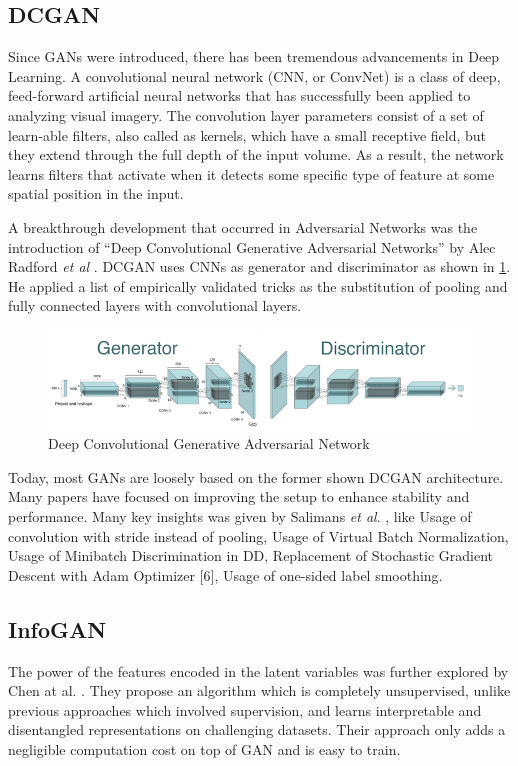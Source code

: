 \documentclass{vldb}
\begin{document}
\subsection{DCGAN}
Since GANs were introduced, there has been tremendous advancements in Deep Learning. A convolutional neural network (CNN, or ConvNet) \cite{imagenet} is a class of deep, feed-forward artificial neural networks that has successfully been applied to analyzing visual imagery. The convolution layer parameters consist of a set of learn-able filters, also called as kernels, which have a small receptive field, but they extend through the full depth of the input volume. As a result, the network learns filters that activate when it detects some specific type of feature at some spatial position in the input.
\par\bigskip
A breakthrough development that occurred in Adversarial Networks was the introduction of “Deep Convolutional Generative Adversarial Networks” by Alec Radford \textit{et al} \cite{dcgan}. DCGAN uses CNNs as generator and discriminator as shown in \ref{fig:dcgan}. He applied a list of empirically validated tricks as the substitution of pooling and fully connected layers with convolutional layers.
\par\bigskip
\begin{figure}[H]
\centering\includegraphics[width=\linewidth]{../Final_Report/images/dcgan.png}
\caption{Deep Convolutional Generative Adversarial Network}
\label{fig:dcgan}
\end{figure}
Today, most GANs are loosely based on the former shown DCGAN \cite{dcgan} architecture. Many papers have focused on improving the setup to enhance stability and performance. Many key insights was given by Salimans \textit{et al}. \cite{improvedgan}, like Usage of convolution with stride instead of pooling, Usage of Virtual Batch Normalization, Usage of Minibatch Discrimination in DD, Replacement of Stochastic Gradient Descent with Adam Optimizer [6], Usage of one-sided label smoothing.
\par\bigskip
\subsection{InfoGAN} %
\label{sec:infogan}
The power of the features encoded in the latent variables was further explored by Chen at al. \cite{infogan}. They propose an algorithm which is completely unsupervised, unlike previous approaches which involved supervision, and learns interpretable and disentangled representations on challenging datasets. Their approach only adds a negligible computation cost on top of GAN and is easy to train.
\par\bigskip
\end{document}
